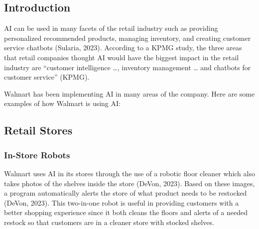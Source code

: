 \documentclass[
]{article}
\begin{document}
\hypertarget{introduction-1}{%
\subsection{Introduction}\label{introduction-1}}

AI can be used in many facets of the retail industry such as providing personalized recommended products, managing inventory, and creating customer service chatbots (Sularia, 2023). According to a KPMG study, the three areas that retail companies thought AI would have the biggest impact in the retail industry are ``customer intelligence \ldots, inventory management \ldots{} and chatbots for customer service'' (KPMG).

Walmart has been implementing AI in many areas of the company. Here are some examples of how Walmart is using AI:

\hypertarget{retail-stores}{%
\subsection{Retail Stores}\label{retail-stores}}

\hypertarget{in-store-robots}{%
\subsubsection{In-Store Robots}\label{in-store-robots}}

Walmart uses AI in its stores through the use of a robotic floor cleaner which also takes photos of the shelves inside the store (DeVon, 2023). Based on these images, a program automatically alerts the store of what product needs to be restocked (DeVon, 2023). This two-in-one robot is useful in providing customers with a better shopping experience since it both cleans the floors and alerts of a needed restock so that customers are in a cleaner store with stocked shelves.
\end{document}
